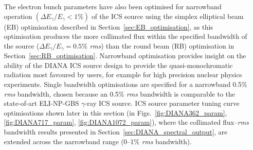 \documentclass[../main.tex]{subfiles}
\begin{document}
The electron bunch parameters have also been optimised for narrowband operation $\left(\Delta E_{\gamma}/E_{\gamma}<1\%\right)$ of the ICS source using the simplex elliptical beam (EB) optimisation described in Section~\ref{sec:EB_optimisation}, as this optimisation produces the more collimated flux within the specified bandwidth of the source ($\Delta E_{\gamma}/E_{\gamma}=0.5\%$ \textit{rms}) than the round beam (RB) optimisation in Section~\ref{sec:RB_optimisation}. Narrowband optimisation provides insight on the ability of the DIANA ICS source design to provide the quasi-monochromatic radiation most favoured by users, for example for high precision nuclear physics experiments. Single bandwidth optimisations are specified for a narrowband 0.5\% \textit{rms} bandwidth, chosen because an 0.5\% \textit{rms} bandwidth is comparable to the state-of-art ELI-NP-GBS \cite{elinp2019vega} $\gamma$-ray ICS source. ICS source parameter tuning curve optimisations shown later in this section (in Figs.~\ref{fig:DIANA362_param}, \ref{fig:DIANA717_param}, \ref{fig:DIANA1072_param}), where the collimated flux--\textit{rms} bandwidth results presented in Section~\ref{sec:DIANA_spectral_output}, are extended across the narrowband range (0--1\% \textit{rms} bandwidth).    
\end{document}
